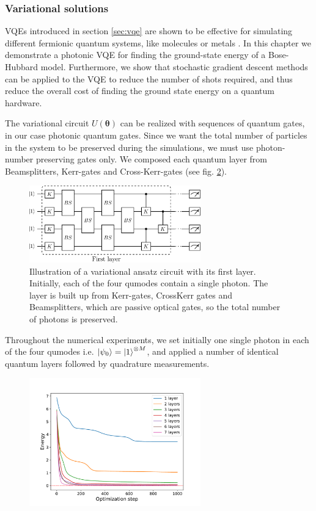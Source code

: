 \documentclass[12pt, a4paper,  nobibnotes]{article}
\begin{document}
\subsubsection{Variational solutions}
VQEs introduced in section \ref{sec:vqe} are shown to be effective for simulating
different fermionic quantum systems, like molecules or metals 
\cite{Wei2020-QCHEM, VQE-HARTREE-FOCK, Kandala2017-VQE-QCHEM, PhysRevX-VQE-QCHEM}.
In this chapter we demonstrate a photonic VQE for finding the ground-state energy of a Bose-Hubbard model.
Furthermore, we show that stochastic gradient descent methods can be applied to the VQE to reduce
the number of shots required, and thus reduce the overall cost of finding the ground state energy
on a quantum hardware.
\par
The variational circuit $U(\pmb\theta)$ can be realized with sequences of quantum gates, in our case
photonic quantum gates.
Since we want the total number of particles in the system to be preserved during the simulations,
we must use photon-number preserving gates only. We composed each quantum layer from 
Beamsplitters, Kerr-gates and Cross-Kerr-gates (see fig. \ref{fig:single_layer_vqe}).
\begin{figure}[H]
    \centering
    \includegraphics[width=0.66\textwidth]{figures/BH-Ansatz.pdf}
    \caption{Illustration of a variational ansatz circuit with its first layer. Initially, each of the four qumodes contain a
    single photon. The layer is built up from Kerr-gates, CrossKerr gates and Beamsplitters, which are passive optical gates, so the
    total number of photons is preserved.}
    \label{fig:single_layer_vqe}
\end{figure}
Throughout the numerical experiments, we set initially one single photon in each of the four qumodes i.e.
$\ket{\psi_0}=\ket{1}^{\otimes M}$, and applied a number of identical quantum layers 
followed by quadrature measurements.
\begin{figure}[H]
    \centering
    \includegraphics[width=0.66\textwidth]{figures/BH-layersearch-2.pdf}
    \caption{}
    \label{fig:single_layer_vqe}
\end{figure}
\end{document}
